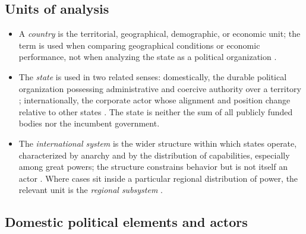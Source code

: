 \documentclass[11pt]{article}
\begin{document}
\subsection{Units of analysis}

\begin{itemize}
	\item A \emph{country} is the territorial, geographical, demographic, or economic unit; the term is used when comparing geographical conditions or economic performance, not when analyzing the state as a political organization \parencite{linz_stepan_1996,waltz_1979}.
	\item The \emph{state} is used in two related senses: domestically, the durable political organization possessing administrative and coercive authority over a territory \parencite{weber1922wirtschaft,hobbes1651leviathan}; internationally, the corporate actor whose alignment and position change relative to other states \parencite{waltz_1979,mearsheimer_2001}. The state is neither the sum of all publicly funded bodies nor the incumbent government.
	\item The \emph{international system} is the wider structure within which states operate, characterized by anarchy and by the distribution of capabilities, especially among great powers; the structure constrains behavior but is not itself an actor \parencite{waltz_1979,mearsheimer_2001}. Where cases sit inside a particular regional distribution of power, the relevant unit is the \emph{regional subsystem} \parencite{buzan_waever_2003}.
\end{itemize}

\subsection{Domestic political elements and actors}
\end{document}
